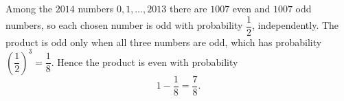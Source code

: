 Among the $2014$ numbers $0,1,\dots,2013$ there are $1007$ even and $1007$ odd numbers, so each chosen number is odd with probability $\dfrac{1}{2}$, independently. The product is odd only when all three numbers are odd, which has probability $\left(\dfrac{1}{2}\right)^3=\dfrac{1}{8}$. Hence the product is even with probability
\[
1-\dfrac{1}{8}=\boxed{\dfrac{7}{8}}.
\]
